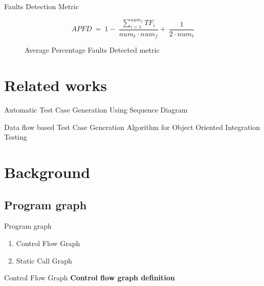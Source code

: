 \documentclass{beamer}
\begin{document}
\begin{frame}{Faults Detection Metric}
    \begin{figure}
        \begin{equation}
            APFD~=~1-~\frac{\sum^{num_f}_{i=1}{TF_i}}{{num}_t \cdot {num}_f} %
                    +~\frac{1}{2 \cdot {num}_t}
            \label{eq:apfd}
        \end{equation}
        \caption{Average Percentage Faults Detected metric \parencite{792604}}
        \label{fig:apfd}
    \end{figure}
\end{frame}


%
\section{Related works}
\begin{frame}{Automatic Test Case Generation Using Sequence Diagram}
\end{frame}

\begin{frame}{Data flow based Test Case Generation Algorithm for Object Oriented Integration Testing}
\end{frame}

%
\section{Background}
\subsection{Program graph}
\begin{frame}{Program graph}
    \begin{enumerate}
        \item Control Flow Graph
        \item Static Call Graph
    \end{enumerate}
\end{frame}

\begin{frame}{Control Flow Graph}
    \textbf{Control flow graph definition}
    \parencite{Allen:1970:CFA:390013.808479}
\end{frame}
\end{document}
